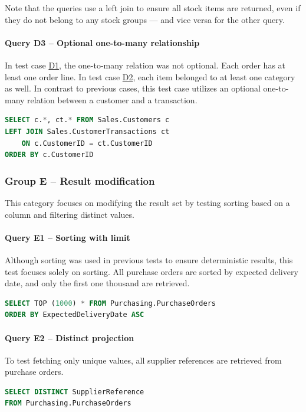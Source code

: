 Note that the queries use a left join to ensure all stock items are returned, even if they do not belong to any stock groups --- and vice versa for the other query.

\paragraph{Query D3 -- Optional one-to-many relationship}
\label{query:d3}
In test case \hyperref[query:d1]{D1}, the one-to-many relation was not optional. Each order has at least one order line. In test case \hyperref[query:d2]{D2}, each item belonged to at least one category as well. In contrast to previous cases, this test case utilizes an optional one-to-many relation between a customer and a transaction. 

\begin{lstlisting}[language=SQL]
SELECT c.*, ct.* FROM Sales.Customers c
LEFT JOIN Sales.CustomerTransactions ct
    ON c.CustomerID = ct.CustomerID
ORDER BY c.CustomerID
\end{lstlisting}

\subsubsection{Group E -- Result modification}
This category focuses on modifying the result set by testing sorting based on a column and filtering distinct values.

\paragraph{Query E1 -- Sorting with limit}
\label{query:e1}
Although sorting was used in previous tests to ensure deterministic results, this test focuses solely on sorting.
All purchase orders are sorted by expected delivery date, and only the first one thousand are retrieved.

\begin{lstlisting}[language=SQL]
SELECT TOP (1000) * FROM Purchasing.PurchaseOrders 
ORDER BY ExpectedDeliveryDate ASC
\end{lstlisting}

\paragraph{Query E2 -- Distinct projection}
\label{query:e2}
To test fetching only unique values, all supplier references are retrieved from purchase orders.

\begin{lstlisting}[language=SQL]
SELECT DISTINCT SupplierReference 
FROM Purchasing.PurchaseOrders
\end{lstlisting}

